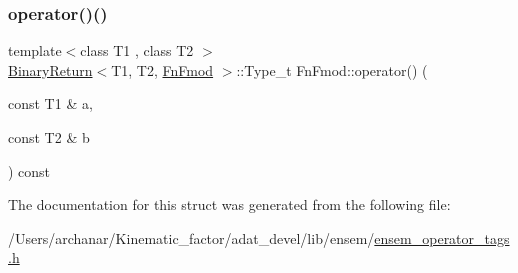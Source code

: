 \mbox{\label{structFnFmod_a9eb37a001ef170a6ad8ce1fcc2feec5e}} 
\subsubsection{\texorpdfstring{operator()()}{operator()()}\hspace{0.1cm}{\footnotesize\ttfamily [2/2]}}
{\footnotesize\ttfamily template$<$class T1 , class T2 $>$ \\
\mbox{\hyperlink{structBinaryReturn}{Binary\+Return}}$<$T1, T2, \mbox{\hyperlink{structFnFmod}{Fn\+Fmod}} $>$\+::Type\+\_\+t Fn\+Fmod\+::operator() (\begin{DoxyParamCaption}\item[{const T1 \&}]{a,  }\item[{const T2 \&}]{b }\end{DoxyParamCaption}) const\hspace{0.3cm}{\ttfamily [inline]}}



The documentation for this struct was generated from the following file\+:\begin{DoxyCompactItemize}
\item 
/\+Users/archanar/\+Kinematic\+\_\+factor/adat\+\_\+devel/lib/ensem/\mbox{\hyperlink{lib_2ensem_2ensem__operator__tags_8h}{ensem\+\_\+operator\+\_\+tags.\+h}}\end{DoxyCompactItemize}
